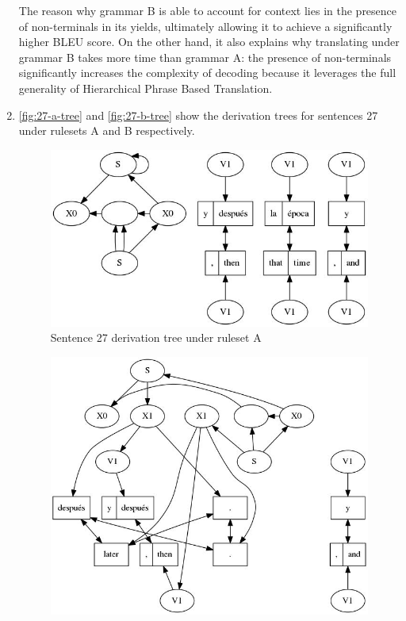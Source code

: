 \documentclass[a4paper,oneside,reqno]{amsart}
\begin{document}
\begin{enumerate}[label=\arabic*.]
    The reason why grammar B is able to account for context lies in the
    presence of non-terminals in its yields, ultimately allowing it to achieve
    a significantly higher BLEU score. On the other hand, it also explains why
    translating under grammar B takes more time than grammar A: the presence of
    non-terminals significantly increases the complexity of decoding because it
    leverages the full generality of Hierarchical Phrase Based Translation.

  \item
    \autoref{fig:27-a-tree} and \autoref{fig:27-b-tree} show the derivation
    trees for sentences 27 under rulesets A and B respectively.
    \begin{figure}[h!]
      \begin{center}
        \includegraphics[scale=0.5]{../output/tree27Advn1.jpg}
      \end{center}
      \caption{Sentence 27 derivation tree under ruleset A}
      \label{fig:27-a-tree}
    \end{figure}
    \begin{figure}[h!]
      \begin{center}
        \includegraphics[scale=0.5]{../output/tree27Bdvn1.jpg}

\end{center}
\end{figure}
\end{enumerate}
\end{document}
